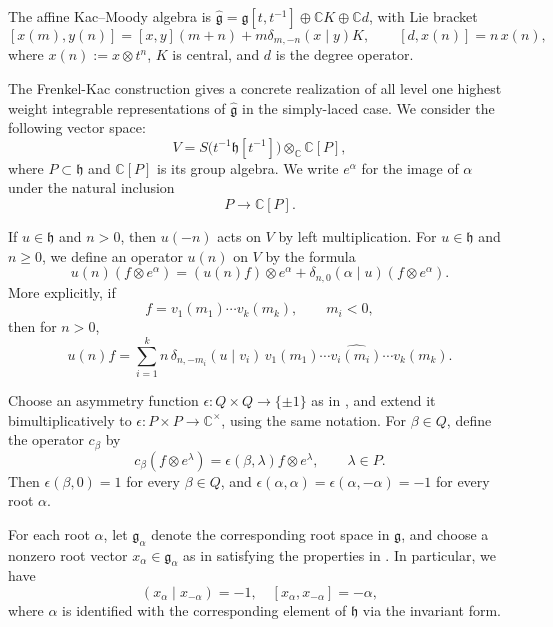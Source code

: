 \documentclass[a4paper, 12pt]{amsart}
\theoremstyle{definition}
\newcommand{\g}{\mathfrak g}
\begin{document}
The affine Kac--Moody algebra is
$\hat{\mathfrak g} = \mathfrak g[t,t^{-1}] \oplus \mathbb CK \oplus \mathbb Cd$,
with Lie bracket
\[
[x(m),y(n)]
=
[x,y](m+n)
+
m\delta_{m,-n}(x\mid y) K,
\qquad
[d,x(n)]=n\,x(n),
\]
where 
$x(n):=x\otimes t^n$,  $K$ is central, and $d$ is the degree operator.

The Frenkel-Kac construction gives a concrete realization of all level one highest weight integrable representations of $\hat{\g}$ in the simply-laced case.  We consider the following vector space:
\begin{equation}
\label{eq:basic-space}
V
=
S\bigl(t^{-1}\mathfrak h[t^{-1}]\bigr)\otimes_{\mathbb{C}} \mathbb C[P],
\end{equation}
where $P\subset \mathfrak h$ and $\mathbb C[P]$ is its group
algebra.  We write $e^\alpha$ for the image of $\alpha$ under the natural inclusion 
\[P \rightarrow \mathbb{C}[P].\]




If $u\in\mathfrak h$ and $n>0$, then $u(-n)$ acts on $V$ by
left multiplication.  For $u \in \mathfrak{h}$ and $n\ge 0$, we define an operator $u(n)$ on $V$ by the formula 
\begin{equation}
\label{eq:heisenberg-action}
u(n)(f\otimes e^\alpha)
=
(u(n)f)\otimes e^\alpha
+
\delta_{n,0}(\alpha\mid u)  (f\otimes e^\alpha).
\end{equation}
More explicitly, if
\[
f=v_1(m_1)\cdots v_k(m_k),
\qquad m_i<0,
\]
then for $n>0$,
\[
u(n)f
=
\sum_{i=1}^k
n\,\delta_{n,-m_i}(u\mid v_i)
\,v_1(m_1)\cdots \widehat{v_i(m_i)}\cdots v_k(m_k).
\]


Choose an asymmetry function $\epsilon:Q\times Q\to \{\pm1\}$ as in \cite[\S7.8]{Kac}, and extend it bimultiplicatively to
$\epsilon:P\times P\to \mathbb C^\times$,
using the same notation. For $\beta\in Q$, define the operator
$c_\beta$ by
\[
c_\beta(f\otimes e^\lambda)
=
\epsilon(\beta,\lambda)f\otimes e^\lambda,
\qquad \lambda\in P.
\]
Then $\epsilon(\beta,0)=1$ for every $\beta\in Q$, and $\epsilon(\alpha,\alpha)=\epsilon(\alpha,-\alpha)=-1$
for every root $\alpha$.


For each root $\alpha$, let $\mathfrak g_\alpha$ denote the
corresponding root space in $\g$, and choose a nonzero root vector
$x_\alpha\in\mathfrak g_\alpha$ as in \cite[\S 7.8]{Kac} satisfying the properties in \cite[(7.8.6)]{Kac}. In particular, 
we have 
\begin{equation}\label{eq:x-bracket}
 (x_\alpha\mid x_{-\alpha})=-1, \quad [x_\alpha,x_{-\alpha}]=-\alpha  ,\end{equation}
where $\alpha$ is identified with the corresponding element of
$\mathfrak h$ via the invariant form.
\end{document}
